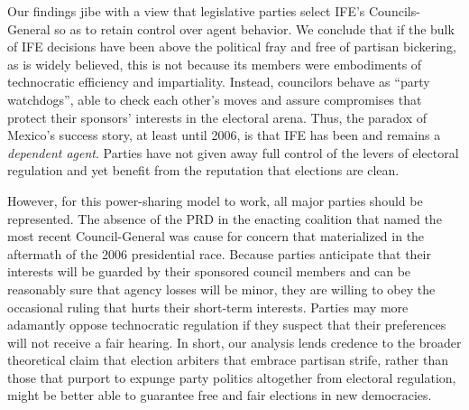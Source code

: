 \documentclass[12 pt, letter]{article}
\begin{document}
Our findings jibe with a view that legislative parties select IFE's
Councils-General so as to retain control over agent behavior.  We
conclude that if the bulk of IFE decisions have been above the
political fray and free of partisan bickering, as is widely
believed, this is not because its members were embodiments of
technocratic efficiency and impartiality.  Instead, councilors
behave as ``party watchdogs'', able to check each other's moves and
assure compromises that protect their sponsors' interests in the
electoral arena.  Thus, the paradox of Mexico's success story, at
least until 2006, is that IFE has been and remains a \emph{dependent
agent}.  Parties have not given away full control of the levers of
electoral regulation and yet benefit from the reputation that
elections are clean.

However, for this power-sharing model to work, all major parties
should be represented. The absence of the PRD in the enacting
coalition that named the most recent Council-General was cause for
concern that materialized in the aftermath of the 2006 presidential
race. Because parties anticipate that their interests will be
guarded by their sponsored council members and can be reasonably
sure that agency losses will be minor, they are willing to obey the
occasional ruling that hurts their short-term interests. Parties may
more adamantly oppose technocratic regulation if they suspect that
their preferences will not receive a fair hearing.  In short, our
analysis lends credence to the broader theoretical claim that
election arbiters that embrace partisan strife, rather than those
that purport to expunge party politics altogether from electoral
regulation, might be better able to guarantee free and fair
elections in new democracies.

\end{document}
